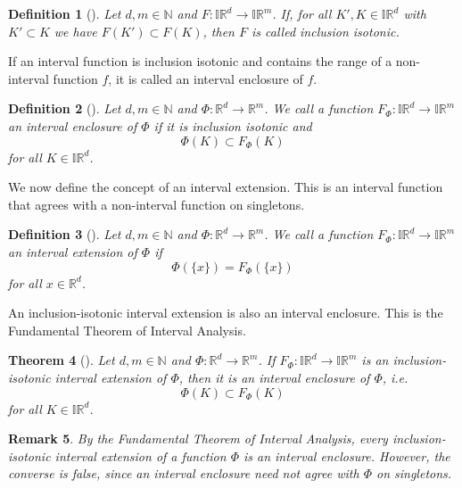 \documentclass[a4paper, 11pt]{article}
\newtheorem{theorem}{Theorem}[section]
\newtheorem{definition}[theorem]{Definition}
\newtheorem{remark}[theorem]{Remark}
\begin{document}
	\begin{definition}[\cite{moore2009introduction}]
		Let $d,m\in \mathbb{N}$ and $F: \mathbb{IR}^d  \to \mathbb{IR}^m$. If, for all $K',K\in\mathbb{IR}^d$ with $K' \subset K$ we have $F(K') \subset F(K)$, then $F$ is called inclusion isotonic.
	\end{definition}
	
	If an interval function is inclusion isotonic and contains the range of a non-interval function $f$, it is called an interval enclosure of $f$.
	
	\begin{definition}[\cite{moore2009introduction}]\label{def: int enclosure}
		Let $d,m \in \mathbb{N}$ and $\Phi: \mathbb{R}^d \to \mathbb{R}^m$. We call a function $F_\Phi: \mathbb{IR}^d \to \mathbb{IR}^m$ an interval enclosure of $\Phi$ if it is inclusion isotonic and
		$$ \Phi(K) \subset F_\Phi(K) $$
		for all $K\in\mathbb{IR}^d$.
	\end{definition}
	
	We now define the concept of an interval extension. This is an interval function that agrees with a non-interval function on singletons.
	
	\begin{definition}[\cite{moore2009introduction}]\label{def: int extension}
		Let $d,m \in \mathbb{N}$ and $\Phi: \mathbb{R}^d \to \mathbb{R}^m$. We call a function $F_\Phi: \mathbb{IR}^d \to \mathbb{IR}^m$ an interval extension of $\Phi$ if
		$$ \Phi(\{x\}) = F_\Phi(\{x\}) $$
		for all $x \in \mathbb{R}^d$.
	\end{definition}
	
	An inclusion-isotonic interval extension is also an interval enclosure. This is the Fundamental Theorem of Interval Analysis.
	
	\begin{theorem}[\cite{moore1966interval}]\label{thm: fund thm of IA}
		Let $d,m \in \mathbb{N}$ and $\Phi: \mathbb{R}^d \to \mathbb{R}^m$. If $F_\Phi: \mathbb{IR}^d  \to \mathbb{IR}^m$ is an inclusion-isotonic interval extension of $\Phi$, then it is an interval enclosure of $\Phi$, i.e.
		$$ \Phi(K) \subset F_\Phi(K) $$
		for all $K\in\mathbb{IR}^d$.
	\end{theorem}
	
	\begin{remark}
		By the Fundamental Theorem of Interval Analysis, every inclusion-isotonic interval extension of a function $\Phi$ is an interval enclosure. However, the converse is false, since an interval enclosure need not agree with $\Phi$ on singletons.
	\end{remark}
	
\end{document}
